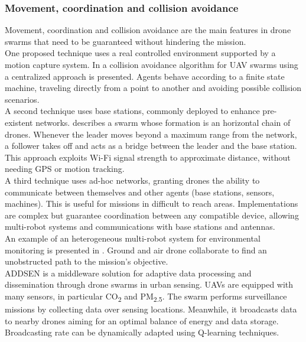 \documentclass[journal]{IEEEtran}
\begin{document}
\subsubsection{Movement, coordination and collision avoidance}
Movement, coordination and collision avoidance are the main features in drone swarms that need to be guaranteed without hindering the mission.
\\
One proposed technique uses a real controlled environment supported by a motion capture system. In \cite{collav} a collision avoidance algorithm for UAV swarms using a centralized approach is presented. Agents behave according to a finite state machine, traveling directly from a point to another and avoiding possible collision scenarios.
\\
A second technique uses base stations, commonly deployed to enhance pre-existent networks. \cite{horswarm} describes a swarm whose formation is an horizontal chain of drones. Whenever the leader moves beyond a maximum range from the network, a follower takes off and acts as a bridge between the leader and the base station. This approach exploits Wi-Fi signal strength to approximate distance, without needing GPS or motion tracking.
\\
A third technique uses ad-hoc networks, granting drones the ability to communicate between themselves and other agents (base stations, sensors, machines). This is useful for missions in difficult to reach areas. Implementations are complex but guarantee coordination between any compatible device, allowing multi-robot systems and communications with base stations and antennas.
\\
An example of an heterogeneous multi-robot system for environmental monitoring is presented in \cite{ragno}. Ground and air drone collaborate to find an unobstructed path to the mission's objective.
\\
ADDSEN \cite{addsen} is a middleware solution for adaptive data processing and dissemination through drone swarms in urban sensing. UAVs are equipped with many sensors, in particular CO\textsubscript{2} and PM\textsubscript{2.5}. The swarm performs surveillance missions by collecting data over sensing locations. Meanwhile, it broadcasts data to nearby drones aiming for an optimal balance of energy and data storage. Broadcasting rate can be dynamically adapted using Q-learning techniques.
\end{document}

